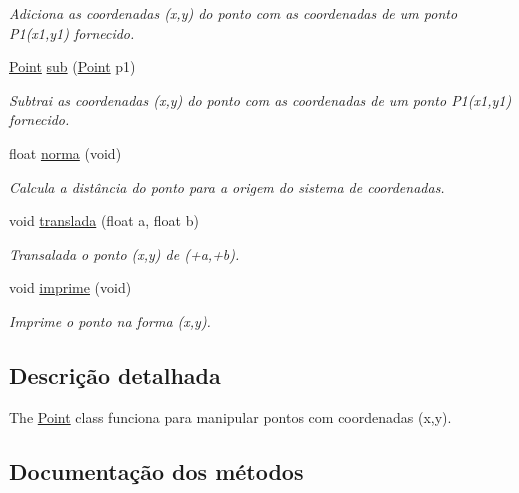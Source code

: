 \begin{DoxyCompactItemize}
\begin{DoxyCompactList}\small\item\em Adiciona as coordenadas (x,y) do ponto com as coordenadas de um ponto P1(x1,y1) fornecido. \end{DoxyCompactList}\item 
\hyperlink{class_point}{Point} \hyperlink{class_point_a9cf2c53b0a4e6282a6712824bb4e9b00}{sub} (\hyperlink{class_point}{Point} p1)
\begin{DoxyCompactList}\small\item\em Subtrai as coordenadas (x,y) do ponto com as coordenadas de um ponto P1(x1,y1) fornecido. \end{DoxyCompactList}\item 
float \hyperlink{class_point_aa3005a9d97e2cb05624414973a214788}{norma} (void)
\begin{DoxyCompactList}\small\item\em Calcula a distância do ponto para a origem do sistema de coordenadas. \end{DoxyCompactList}\item 
void \hyperlink{class_point_ad9676e36f3444534b609e3c68422239a}{translada} (float a, float b)
\begin{DoxyCompactList}\small\item\em Transalada o ponto (x,y) de (+a,+b). \end{DoxyCompactList}\item 
\mbox{\label{class_point_a188350fb70e5b297a659a31ab8887ca3}} 
void \hyperlink{class_point_a188350fb70e5b297a659a31ab8887ca3}{imprime} (void)
\begin{DoxyCompactList}\small\item\em Imprime o ponto na forma (x,y). \end{DoxyCompactList}\end{DoxyCompactItemize}


\subsection{Descrição detalhada}
The \hyperlink{class_point}{Point} class funciona para manipular pontos com coordenadas (x,y). 

\subsection{Documentação dos métodos}
\mbox{\label{class_point_a9dbea84b07b0a8ec3bbb9e58b3d15899}} 
